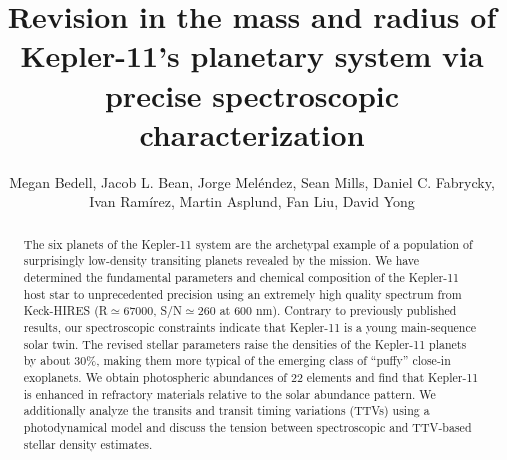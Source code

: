 \documentclass[oneside]{emulateapj}
\begin{document}
\graphicspath{ {figures/} }

\title{Revision in the mass and radius of Kepler-11's planetary system via precise spectroscopic characterization}

\author{Megan Bedell,
Jacob L. Bean,
Jorge Mel\'{e}ndez,
Sean Mills,
Daniel C. Fabrycky,
Ivan Ram\'{i}rez,
Martin Asplund,
Fan Liu,
David Yong}





\begin{abstract}

The six planets of the Kepler-11 system are the archetypal example of a population of surprisingly low-density transiting planets revealed by the \Kepler mission. We have determined the fundamental parameters and chemical composition of the Kepler-11 host star to unprecedented precision using an extremely high quality spectrum from Keck-HIRES (R$\simeq$67000, S/N$\simeq$260 at 600 nm). Contrary to previously published results, our spectroscopic constraints indicate that Kepler-11 is a young main-sequence solar twin. The revised stellar parameters raise the densities of the Kepler-11 planets by about 30\%, making them more typical of the emerging class of ``puffy'' close-in exoplanets. We obtain photospheric abundances of 22 elements and find that Kepler-11 is enhanced in refractory materials relative to the solar abundance pattern. We additionally analyze the \Kepler transits and transit timing variations (TTVs) using a photodynamical model and discuss the tension between spectroscopic and TTV-based stellar density estimates.

\end{abstract}
\end{document}
